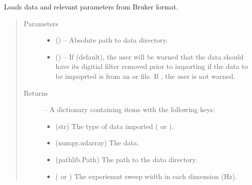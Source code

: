 \documentclass[letterpaper,10pt,english]{sphinxmanual}
\begin{document}
\begin{fulllineitems}
\label{\detokenize{references/load:nmrespy.load.load_bruker}}
\sphinxAtStartPar
Loads data and relevant parameters from Bruker format.
\begin{quote}\begin{description}
\item[{Parameters}] \leavevmode\begin{itemize}
\item {} 
\sphinxAtStartPar
{} () – Absolute path to data directory.

\item {} 
\sphinxAtStartPar
{} (\sphinxstyleliteralemphasis{\sphinxupquote{, }}) – If  (default), the user will be warned that the data should
have its digitial filter removed prior to importing if the data to be
impoprted is from an  or  file. If , the user is
not warned.

\end{itemize}

\item[{Returns}] \leavevmode
\sphinxAtStartPar

\sphinxAtStartPar
{} – A dictionary containing items with the following keys:
\begin{itemize}
\item {} 
\sphinxAtStartPar
{} (str) \sphinxhyphen{} The type of data imported ( or
).

\item {} 
\sphinxAtStartPar
{} (numpy.ndarray) \sphinxhyphen{} The data.

\item {} 
\sphinxAtStartPar
{} (pathlib.Path) \sphinxhyphen{} The path to the data directory.

\item {} 
\sphinxAtStartPar
{} (\sphinxtitleref{{[}float{]}} or ) \sphinxhyphen{} The experiemnt
sweep width in each dimension (Hz).


\end{itemize}
\end{description}
\end{quote}
\end{fulllineitems}
\end{document}
